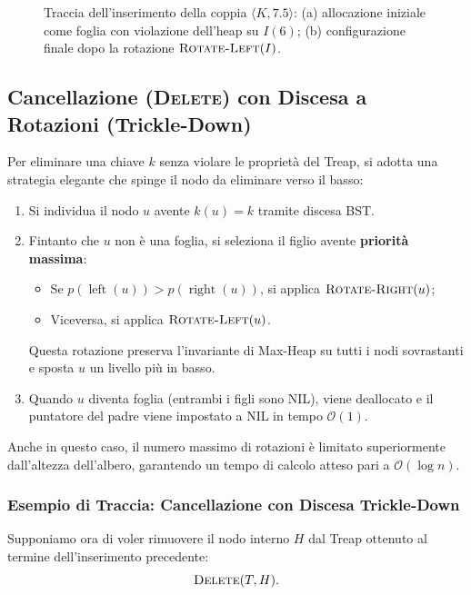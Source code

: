 \begin{figure}[H]
{%
}
\caption{Traccia dell'inserimento della coppia $\langle K, 7.5 \rangle$: (a) allocazione iniziale come foglia con violazione dell'heap su $I(6)$; (b) configurazione finale dopo la rotazione $\textsc{Rotate-Left}(I)$.}
\label{fig:treap-insert-trace}
\end{figure}

\FloatBarrier
\subsection{Cancellazione (\textsc{Delete}) con Discesa a Rotazioni (Trickle-Down)}
Per eliminare una chiave $k$ senza violare le propriet\`a del Treap, si adotta una strategia elegante che spinge il nodo da eliminare verso il basso:
\begin{enumerate}
    \item Si individua il nodo $u$ avente $k(u) = k$ tramite discesa BST.
    \item Fintanto che $u$ non \`e una foglia, si seleziona il figlio avente \textbf{priorit\`a massima}:
    \begin{itemize}
        \item Se $p(\operatorname{left}(u)) > p(\operatorname{right}(u))$, si applica $\textsc{Rotate-Right}(u)$;
        \item Viceversa, si applica $\textsc{Rotate-Left}(u)$.
    \end{itemize}
    Questa rotazione preserva l'invariante di Max-Heap su tutti i nodi sovrastanti e sposta $u$ un livello pi\`u in basso.
    \item Quando $u$ diventa foglia (entrambi i figli sono NIL), viene deallocato e il puntatore del padre viene impostato a NIL in tempo $\mathcal{O}(1)$.
\end{enumerate}

Anche in questo caso, il numero massimo di rotazioni \`e limitato superiormente dall'altezza dell'albero, garantendo un tempo di calcolo atteso pari a $\mathcal{O}(\log n)$.

\subsubsection{Esempio di Traccia: Cancellazione con Discesa Trickle-Down}
Supponiamo ora di voler rimuovere il nodo interno $H$ dal Treap ottenuto al termine dell'inserimento precedente:
\begin{equation}
  \textsc{Delete}(T, H).
\end{equation}

